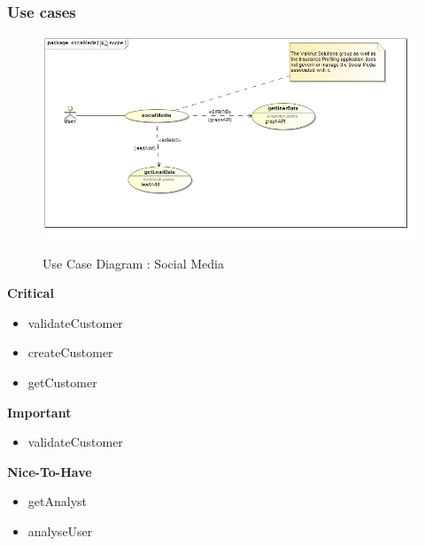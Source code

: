 \documentclass{article}
\begin{document}
		\subsubsection{Use cases}
		\begin{figure}[H]
		\includegraphics[width=\textwidth]{images/uc__socialMedia__scope.jpg}  \\
		\caption{Use Case Diagram : Social Media}
		\end{figure}

		\begin{flushleft}
			\textbf{Critical}
				\begin{itemize}
	  				\item validateCustomer
	  				\item createCustomer
	  				\item getCustomer
				\end{itemize}
			\textbf{Important}
				\begin{itemize}
	  				\item validateCustomer
				\end{itemize}
			\textbf{Nice-To-Have}
				\begin{itemize}
	  				\item getAnalyst
	  				\item analyseUser
				\end{itemize}
		\end{flushleft}
\end{document}
